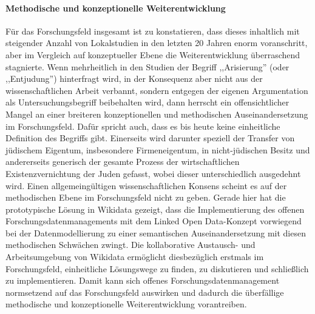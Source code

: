 \paragraph{Methodische und konzeptionelle Weiterentwicklung} Für das Forschungsfeld insgesamt ist zu konstatieren, dass dieses inhaltlich mit steigender Anzahl von Lokalstudien in den letzten 20 Jahren enorm voranschritt, aber im Vergleich auf konzeptueller Ebene die Weiterentwicklung überraschend stagnierte. Wenn mehrheitlich in den Studien der Begriff ,,Arisierung'' (oder ,,Entjudung'') hinterfragt wird, in der Konsequenz aber nicht aus der wissenschaftlichen Arbeit verbannt, sondern entgegen der eigenen Argumentation als Untersuchungsbegriff beibehalten wird, dann herrscht ein offensichtlicher Mangel an einer breiteren konzeptionellen und methodischen Auseinandersetzung im Forschungsfeld. Dafür spricht auch, dass es bis heute keine einheitliche Definition des Begriffs gibt. Einerseits wird darunter speziell der Transfer von jüdischem Eigentum, insbesondere Firmeneigentum, in nicht-jüdischen Besitz und andererseits generisch der gesamte Prozess der wirtschaftlichen Existenzvernichtung der Juden gefasst, wobei dieser unterschiedlich ausgedehnt wird. Einen allgemeingültigen wissenschaftlichen Konsens scheint es auf der methodischen Ebene im Forschungsfeld nicht zu geben. Gerade hier hat die prototypische Lösung in Wikidata gezeigt, dass die Implementierung des offenen Forschungsdatenmanagements mit dem Linked Open Data-Konzept vorwiegend bei der Datenmodellierung zu einer semantischen Auseinandersetzung mit diesen methodischen Schwächen zwingt. Die kollaborative Austausch- und Arbeitsumgebung von Wikidata ermöglicht diesbezüglich erstmals im Forschungsfeld, einheitliche Lösungswege zu finden, zu diskutieren und schließlich zu implementieren. Damit kann sich offenes Forschungsdatenmanagement normsetzend auf das Forschungsfeld auswirken und dadurch die überfällige methodische und konzeptionelle Weiterentwicklung vorantreiben. 

